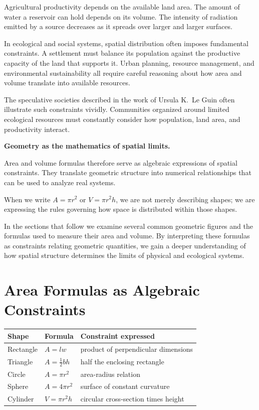 \documentclass[11pt, openany]{book}
\theoremstyle{plain}
\theoremstyle{definition}
\theoremstyle{remark}
\begin{document}
Agricultural productivity depends on the available land area. The amount
of water a reservoir can hold depends on its volume. The intensity of
radiation emitted by a source decreases as it spreads over larger and
larger surfaces.

In ecological and social systems, spatial distribution often imposes
fundamental constraints. A settlement must balance its population
against the productive capacity of the land that supports it. Urban
planning, resource management, and environmental sustainability all
require careful reasoning about how area and volume translate into
available resources.

The speculative societies described in the work of Ursula K.~Le Guin
often illustrate such constraints vividly. Communities organized around
limited ecological resources must constantly consider how population,
land area, and productivity interact.

\medskip

\textbf{Geometry as the mathematics of spatial limits.}

Area and volume formulas therefore serve as algebraic expressions of
spatial constraints. They translate geometric structure into numerical
relationships that can be used to analyze real systems.

When we write $A=\pi r^2$ or $V=\pi r^2 h$, we are not merely describing
shapes; we are expressing the rules governing how space is distributed
within those shapes.

In the sections that follow we examine several common geometric figures
and the formulas used to measure their area and volume. By interpreting
these formulas as constraints relating geometric quantities, we gain a
deeper understanding of how spatial structure determines the limits of
physical and ecological systems.

\section{Area Formulas as Algebraic Constraints}

\begin{center}
\renewcommand{\arraystretch}{1.5}
\begin{tabular}{llp{5cm}}
\toprule
Shape & Formula & Constraint expressed \\
\midrule
Rectangle & $A=lw$           & product of perpendicular dimensions \\
Triangle   & $A=\tfrac12 bh$ & half the enclosing rectangle \\
Circle     & $A=\pi r^2$     & area-radius relation \\
Sphere     & $A=4\pi r^2$   & surface of constant curvature \\
Cylinder   & $V=\pi r^2 h$  & circular cross-section times height \\
\bottomrule
\end{tabular}
\end{center}
\end{document}
